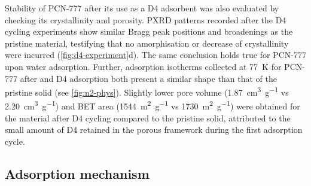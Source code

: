Stability of PCN-777 after its use as a D4 adsorbent was also evaluated by
checking its crystallinity and porosity. PXRD patterns recorded after the D4
cycling experiments show similar Bragg peak positions and broadenings as the
pristine material, testifying that no amorphisation or decrease of crystallinity
were incurred (\cref{fig:d4-experiment}d). The same conclusion holds true for
PCN-777 upon water adsorption. Further,  adsorption isotherms collected
at \SI{77}{\kelvin} for PCN-777 after  and D4 adsorption both present a
similar shape than that of the pristine solid (see \cref{fig:n2-phys}). Slightly
lower pore volume (\SI{1.87}{\centi\metre\cubed\per\gram} vs
\SI{2.20}{\centi\metre\cubed\per\gram}) and BET area
(\SI{1544}{\metre\squared\per\gram} vs \SI{1730}{\metre\squared\per\gram}) were
obtained for the material after D4 cycling compared to the pristine solid,
attributed to the small amount of D4 retained in the porous framework during the
first adsorption cycle.

\subsection{Adsorption mechanism}\label{adsorption-mechanism}

